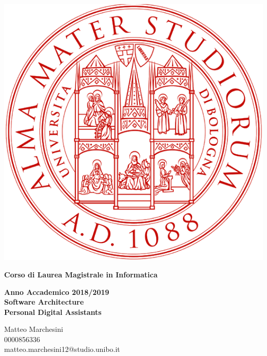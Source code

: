 \documentclass[12pt, a4paper]{report}
\begin{document}
\begin{titlepage}
\vspace{15mm}
\begin{center}
  \includegraphics{Images/uniboLogo}
\end{center}
\begin{center}
{\normalsize{\bf Corso di Laurea Magistrale in Informatica}}\\
\vspace{5mm}

{\normalsize{\bf Anno Accademico 2018/2019}}\\
\vspace{20mm}
{\Large{\bf Software Architecture}}\\
\vspace{10mm}
{\Huge{\bf Personal Digital Assistants}}\\

\vspace{25mm}
\end{center}
\begin{flushright}
{\large{Matteo Marchesini\\0000856336\\matteo.marchesini12@studio.unibo.it}}
\end{flushright}
\end{titlepage}
\end{document}
